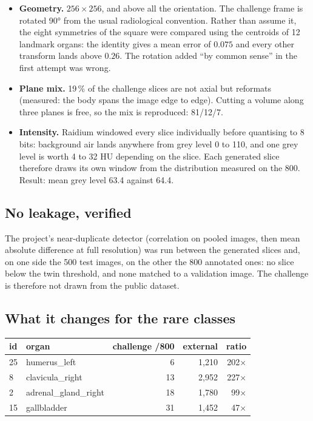 \documentclass{article}
\begin{document}
\begin{itemize}
    \item \textbf{Geometry.} $256\times256$, and above all the orientation. The
    challenge frame is rotated 90° from the usual radiological convention.
    Rather than assume it, the eight symmetries of the square were compared using
    the centroids of 12 landmark organs: the identity gives a mean error of
    $0.075$ and every other transform lands above $0.26$. The rotation added ``by
    common sense'' in the first attempt was wrong.
    \item \textbf{Plane mix.} 19\,\% of the challenge slices are not axial but
    reformats (measured: the body spans the image edge to edge). Cutting a volume
    along three planes is free, so the mix is reproduced: 81/12/7.
    \item \textbf{Intensity.} Raidium windowed every slice individually before
    quantising to 8 bits: background air lands anywhere from grey level 0 to 110,
    and one grey level is worth 4 to 32 HU depending on the slice. Each generated
    slice therefore draws its own window from the distribution measured on the
    800. Result: mean grey level 63.4 against 64.4.
\end{itemize}

\subsection{No leakage, verified}

The project's near-duplicate detector (correlation on pooled images, then mean
absolute difference at full resolution) was run between the generated slices and,
on one side the 500 test images, on the other the 800 annotated ones: no slice
below the twin threshold, and none matched to a validation image. The challenge
is therefore not drawn from the public dataset.

\subsection{What it changes for the rare classes}

\begin{center}
\begin{tabular}{llrrr}
\hline
\textbf{id} & \textbf{organ} & \textbf{challenge /800} & \textbf{external} & \textbf{ratio} \\
\hline
25 & humerus\_left & 6 & 1{,}210 & 202$\times$ \\
8 & clavicula\_right & 13 & 2{,}952 & 227$\times$ \\
2 & adrenal\_gland\_right & 18 & 1{,}780 & 99$\times$ \\
15 & gallbladder & 31 & 1{,}452 & 47$\times$ \\
\hline
\end{tabular}
\end{center}
\end{document}
